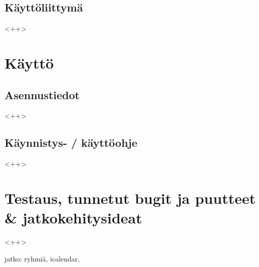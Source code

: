 \documentclass[a4paper,12pt]{report}
\begin{document}
\section{Käyttöliittymä} <++>

\chapter{Käyttö}
\section{Asennustiedot} <++>
\section{Käynnistys- / käyttöohje} <++>

\chapter{Testaus, tunnetut bugit ja puutteet \& jatkokehitysideat} <++>

jatko: ryhmiä, icalendar,

\end{document}
